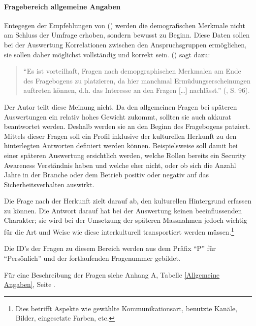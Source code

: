 \documentclass[../../main.tex]{subfiles}
\begin{document}
\paragraph*{Fragebereich allgemeine Angaben}\mbox{}

\begin{sloppypar}
Entegegen der Empfehlungen von \citeauthor{mayer_interview_2013} (\citeyear{mayer_interview_2013}) werden die demografischen Merkmale nicht am Schluss der Umfrage erhoben, sondern bewusst zu Beginn. Diese Daten sollen bei der Auswertung Korrelationen zwischen den Anspruchsgruppen ermöglichen, sie sollen daher möglichst vollständig und korrekt sein. \citeauthor{mayer_interview_2013} (\citeyear{mayer_interview_2013}) sagt dazu:

\begin{quote}
"`Es ist vorteilhaft, Fragen nach demopgraphischen Merkmalen am Ende des Fragebogens zu platzieren, da hier manchmal Ermüdungserscheinungen auftreten können, d.h. das Interesse an den Fragen [\dots] nachlässt."' (\cite{mayer_interview_2013}, S. 96).
\end{quote}

Der Autor teilt diese Meinung nicht. Da den allgemeinen Fragen bei späteren Auswertungen ein relativ hohes Gewicht zukommt, sollten sie auch akkurat beantwortet werden. Deshalb werden sie an den Beginn des Fragebogens patziert. Mittels dieser Fragen soll ein Profil inklusive der kulturellen Herkunft zu den hinterlegten Antworten definiert werden können. Beispielsweise soll damit bei einer späteren Auswertung ersichtlich werden, welche Rollen bereits ein Security Awareness Verständnis haben und welche eher nicht, oder ob sich die Anzahl Jahre in der Branche oder dem Betrieb positiv oder negativ auf das Sicherheitsverhalten auswirkt.

Die Frage nach der Herkunft zielt darauf ab, den kulturellen Hintergrund erfassen zu können. Die Antwort darauf hat bei der Auswertung keinen beeinflussenden Charakter; sie wird bei der Umsetzung der späteren Massnahmen jedoch wichtig für die Art und Weise wie diese interkulturell transportiert werden müssen.\footnote {Dies betrifft Aspekte wie gewählte Kommunikationsart, benutzte Kanäle, Bilder, eingesetzte Farben, etc.}

Die ID's der Fragen zu diesem Bereich werden aus dem Präfix "`P"' für "`Persönlich"' und der fortlaufenden Fragenummer gebildet.

Für eine Beschreibung der Fragen siehe Anhang A, Tabelle \ref{Allgemeine Angaben}, Seite \pageref{Allgemeine Angaben}.
\end{sloppypar}
\end{document}
